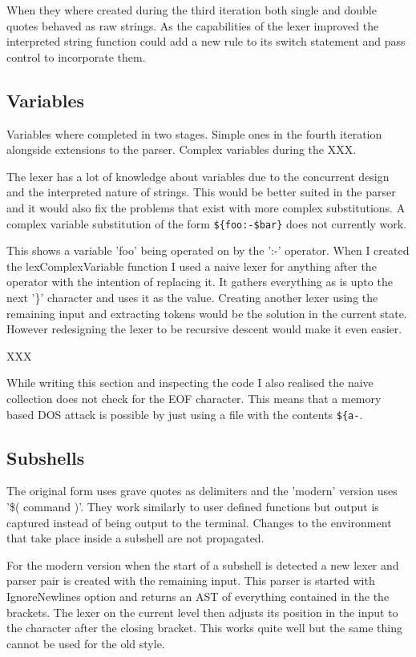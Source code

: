 When they where created during the third iteration both single and double quotes behaved as raw strings.
As the capabilities of the lexer improved the interpreted string function could add a new rule to its switch statement and
pass control to incorporate them.

\subsection{Variables}
Variables where completed in two stages.
Simple ones in the fourth iteration alongside extensions to the parser.
Complex variables during the XXX.

The lexer has a lot of knowledge about variables due to the concurrent design and the interpreted nature of strings.
This would be better suited in the parser and it would also fix the problems that exist with more complex substitutions.
A complex variable substitution of the form \verb!${foo:-$bar}! does not currently work.

This shows a variable 'foo' being operated on by the ':-' operator.
When I created the lexComplexVariable function I used a naive lexer for anything after the operator with the intention of replacing it.
It gathers everything as is upto the next '\}' character and uses it as the value.
Creating another lexer using the remaining input and extracting tokens would be the solution in the current state.
However redesigning the lexer to be recursive descent would make it even easier.

XXX

While writing this section and inspecting the code I also realised the naive collection does not check for the EOF character.
This means that a memory based DOS attack is possible by just using a file with the contents \verb!${a-!.

\subsection{Subshells}
The original form uses grave quotes as delimiters and the 'modern' version uses '\$( command )'.
They work similarly to user defined functions but output is captured instead of being output to the terminal.
Changes to the environment that take place inside a subshell are not propagated. 

For the modern version when the start of a subshell is detected a new lexer and parser pair is created with the remaining input.
This parser is started with IgnoreNewlines option and returns an AST of everything contained in the the brackets.
The lexer on the current level then adjusts its position in the input to the character after the closing bracket.
This works quite well but the same thing cannot be used for the old style.

